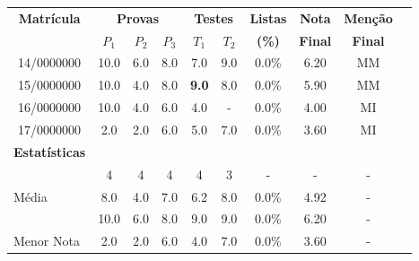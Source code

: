\begin{longtable}{cccccccccc}
\toprule
\multirow{2}{*}{\textbf{Matrícula}} & \multicolumn{3}{c}{\textbf{Provas}} & \multicolumn{2}{c}{\textbf{Testes}} & \textbf{Listas} & \textbf{Nota} & \textbf{Menção} \\
 & \textbf{$P_{1}$} & \textbf{$P_{2}$} & \textbf{$P_{3}$} & \textbf{$T_{1}$} & \textbf{$T_{2}$} & \textbf{(\%)} & \textbf{Final} & \textbf{Final} \\
\toprule
\rowcolor[gray]{.9}
14/0000000 & 10.0 & 6.0 & 8.0 & 7.0 & 9.0 & 0.0\% & 6.20 & MM \\
15/0000000 & 10.0 & 4.0 & 8.0 & \textbf{9.0} & 8.0 & 0.0\% & 5.90 & MM \\
\rowcolor[gray]{.9}
16/0000000 & 10.0 & 4.0 & 6.0 & 4.0 & - & 0.0\% & 4.00 & MI \\
17/0000000 & 2.0 & 2.0 & 6.0 & 5.0 & 7.0 & 0.0\% & 3.60 & MI \\
\toprule
\textbf{Estatísticas} & \multicolumn{9}{c}{} \\
\toprule
\rowcolor[gray]{.9}
\multicolumn{1}{l}{Presentes} & 4 & 4 & 4 & 4 & 3 & - & - & - \\
\multicolumn{1}{l}{Média} & 8.0 & 4.0 & 7.0 & 6.2 & 8.0 & 0.0\% & 4.92 & - \\
\rowcolor[gray]{.9}
\multicolumn{1}{l}{Maior Nota} & 10.0 & 6.0 & 8.0 & 9.0 & 9.0 & 0.0\% & 6.20 & - \\
\multicolumn{1}{l}{Menor Nota} & 2.0 & 2.0 & 6.0 & 4.0 & 7.0 & 0.0\% & 3.60 & - \\
\bottomrule
\end{longtable}

\let\thefootnote\relax{}
